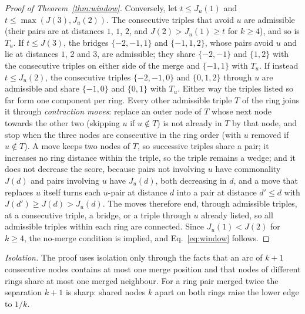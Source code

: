 \begin{proof}[Proof of Theorem~\ref{thm:window}]
Conversely, let $t\le J_u(1)$ and $t\le\max(J(3),J_u(2))$. The consecutive triples
that avoid $u$ are admissible (their pairs are at distances $1$, $1$, $2$, and
$J(2)>J_u(1)\ge t$ for $k\ge4$), and so is $T_u$. If $t\le J(3)$, the bridges
$\{-2,-1,1\}$ and $\{-1,1,2\}$, whose pairs avoid $u$ and lie at distances $1$, $2$ and
$3$, are admissible; they share $\{-2,-1\}$ and $\{1,2\}$ with the consecutive triples
on either side of the merge and $\{-1,1\}$ with $T_u$. If instead $t\le J_u(2)$, the
consecutive triples $\{-2,-1,0\}$ and $\{0,1,2\}$ through $u$ are admissible and share
$\{-1,0\}$ and $\{0,1\}$ with $T_u$. Either way the triples listed so far form one
component per ring. Every other admissible triple $T$ of the ring joins it through
\emph{contraction moves}: replace an outer node of $T$ whose next node towards the
other two (skipping $u$ if $u\notin T$) is not already in $T$ by that node, and stop
when the three nodes are consecutive in the ring order (with $u$ removed if
$u\notin T$). A move keeps two nodes of $T$, so successive triples share a pair; it
increases no ring distance within the triple, so the triple remains a wedge; and it
does not decrease the score, because pairs not involving $u$ have commonality $J(d)$
and pairs involving $u$ have $J_u(d)$, both decreasing in $d$, and a move that replaces
$u$ itself turns each $u$-pair at distance $d$ into a pair at distance $d'\le d$ with
$J(d')\ge J(d)>J_u(d)$. The moves therefore
end, through admissible triples, at a consecutive triple, a bridge, or a triple
through $u$ already listed, so all admissible triples within each ring are connected.
Since $J_u(1)<J(2)$ for $k\ge4$, the no-merge condition is implied, and
Eq.~\eqref{eq:window} follows.
\end{proof}

\emph{Isolation.} The proof uses isolation only through the facts that an arc of $k+1$
consecutive nodes contains at most one merge position and that nodes of different rings
share at most one merged neighbour. For a ring pair merged twice the separation $k+1$ is
sharp: shared nodes $k$ apart on both rings raise the lower edge to $1/k$.
